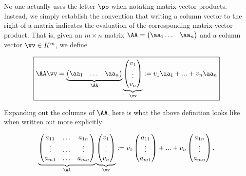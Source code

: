 \begin{deriv}
    No one actually uses the letter $\pp$ when notating matrix-vector products. Instead, we simply establish the convention that writing a column vector to the right of a matrix indicates the evaluation of the corresponding matrix-vector product. That is, given an $m \times n$ matrix $\AA = \begin{pmatrix} \aa_1 \hdots & \aa_n \end{pmatrix}$ and a column vector $\vv \in K^m$, we define
    
    \begin{align*}
        \boxed
        {
            \AA \vv =
            \underbrace
            {\begin{pmatrix} 
                \aa_1 & \hdots & \aa_n
            \end{pmatrix}}_\AA
            \underbrace{
            \begin{pmatrix} 
                v_1 \\ \vdots \\ v_n 
            \end{pmatrix}}_\vv
            :=
            v_1 \aa_1 + ... + v_n \aa_n
        }
    \end{align*}
    
    Expanding out the columns of $\AA$, here is what the above definition looks like when written out more explicitly:
    
    \begin{align*}
        \underbrace
        {\begin{pmatrix} 
            a_{11} & \hdots & a_{1n} \\
            \vdots & \hdots & \vdots \\
            a_{m1} & \hdots & a_{mn}
        \end{pmatrix}}_\AA
        \underbrace{
        \begin{pmatrix} 
            v_1 \\ \vdots \\ v_n 
        \end{pmatrix}}_\vv
        :=
        v_1 
        \begin{pmatrix} a_{11} \\ \vdots \\ a_{m1} \end{pmatrix}
        + ... + v_n 
        \begin{pmatrix} a_{1n} \\ \vdots \\ a_{mn} \end{pmatrix}.
    \end{align*}
\end{deriv}

